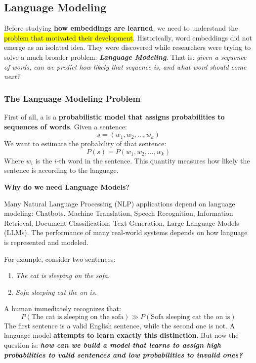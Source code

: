 \subsection{Language Modeling}\label{sec:language-modeling}

Before studying \textbf{how embeddings are learned}, we need to understand the \hl{problem that motivated their development}. Historically, word embeddings did not emerge as an isolated idea. They were discovered while researchers were trying to solve a much broader problem: \textbf{\emph{Language Modeling}}. That is: \emph{given a sequence of words, can we predict how likely that sequence is, and what word should come next?}

\longline

\subsubsection{The Language Modeling Problem}\label{sec:the-language-modeling-problem}

First of all, a  is a \textbf{probabilistic model that assigns probabilities to sequences of words}. Given a sentence:
\begin{equation*}
    s = \left(w_1, w_2, \dots, w_k\right)
\end{equation*}
We want to estimate the probability of that sentence:
\begin{equation*}
    P(s) = P\left(w_1, w_2, \dots, w_k\right)
\end{equation*}
Where $w_i$ is the $i$-th word in the sentence. This quantity measures how likely the sentence is according to the language.

\highspace
\begin{flushleft}
    \textcolor{Green3}{ \textbf{Why do we need Language Models?}}
\end{flushleft}
Many Natural Language Processing (NLP) applications depend on language modeling: Chatbots, Machine Translation, Speech Recognition, Information Retrieval, Document Classification, Text Generation, Large Language Models (LLMs). The performance of many real-world systems depends on how language is represented and modeled.

\highspace
For example, consider two sentences:
\begin{enumerate}
    \item \emph{The cat is sleeping on the sofa.}
    \item \emph{Sofa sleeping cat the on is.}
\end{enumerate}
A human immediately recognizes that:
\begin{equation*}
    P(\text{The cat is sleeping on the sofa}) \gg P(\text{Sofa sleeping cat the on is})
\end{equation*}
The first sentence is a valid English sentence, while the second one is not. A language model \textbf{attempts to learn exactly this distinction}. But now the question is: \emph{\textbf{how can we build a model that learns to assign high probabilities to valid sentences and low probabilities to invalid ones?}}

